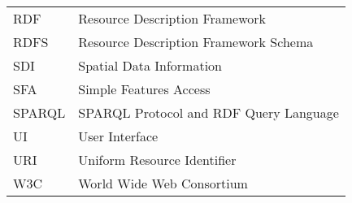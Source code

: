 \begin{longtable}{lp{11cm}}
  RDF &  Resource Description Framework\\
  RDFS & Resource Description Framework Schema\\
  SDI  & Spatial Data Information\\
  SFA & Simple Features Access \\
  SPARQL	 & SPARQL Protocol and RDF Query Language\\
  UI  & User Interface \\
  URI &	Uniform Resource Identifier\\
  
  W3C & World Wide Web Consortium \\
  







  
  
 
\end{longtable}
